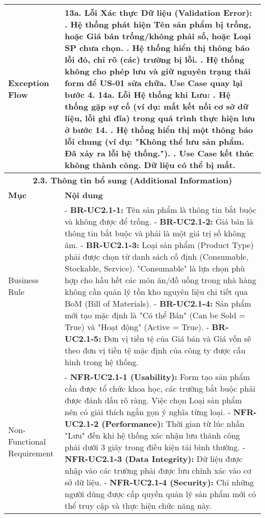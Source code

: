 \begin{longtable}{|m{4cm}|p{11cm}|}
\hline
Exception Flow & \textbf{13a. Lỗi Xác thực Dữ liệu (Validation Error):} \newline    1. Hệ thống phát hiện Tên sản phẩm bị trống, hoặc Giá bán trống/không phải số, hoặc Loại SP chưa chọn. \newline    2. Hệ thống hiển thị thông báo lỗi đỏ, chỉ rõ (các) trường bị lỗi. \newline    3. Hệ thống không cho phép lưu và giữ nguyên trạng thái form để US-01 sửa chữa. Use Case quay lại bước 4. \newline \textbf{14a. Lỗi Hệ thống khi Lưu:} \newline    1. Hệ thống gặp sự cố (ví dụ: mất kết nối cơ sở dữ liệu, lỗi ghi đĩa) trong quá trình thực hiện lưu ở bước 14. \newline    2. Hệ thống hiển thị một thông báo lỗi chung (ví dụ: "Không thể lưu sản phẩm. Đã xảy ra lỗi hệ thống."). \newline    3. Use Case kết thúc không thành công. Dữ liệu có thể bị mất. \\
\hline
\multicolumn{2}{|c|}{\textbf{2.3. Thông tin bổ sung (Additional Information)}} \\
\hline
\textbf{Mục} & \textbf{Nội dung} \\
\hline
Business Rule & - \textbf{BR-UC2.1-1:} Tên sản phẩm là thông tin bắt buộc và không được để trống. \newline - \textbf{BR-UC2.1-2:} Giá bán là thông tin bắt buộc và phải là một giá trị số không âm. \newline - \textbf{BR-UC2.1-3:} Loại sản phẩm (Product Type) phải được chọn từ danh sách cố định (Consumable, Stockable, Service). "Consumable" là lựa chọn phù hợp cho hầu hết các món ăn/đồ uống trong nhà hàng không cần quản lý tồn kho nguyên liệu chi tiết qua BoM (Bill of Materials). \newline - \textbf{BR-UC2.1-4:} Sản phẩm mới tạo mặc định là "Có thể Bán" (Can be Sold = True) và "Hoạt động" (Active = True). \newline - \textbf{BR-UC2.1-5:} Đơn vị tiền tệ của Giá bán và Giá vốn sẽ theo đơn vị tiền tệ mặc định của công ty được cấu hình trong hệ thống. \\
\hline
Non-Functional Requirement & - \textbf{NFR-UC2.1-1 (Usability):} Form tạo sản phẩm cần được tổ chức khoa học, các trường bắt buộc phải được đánh dấu rõ ràng. Việc chọn Loại sản phẩm nên có giải thích ngắn gọn ý nghĩa từng loại. \newline - \textbf{NFR-UC2.1-2 (Performance):} Thời gian từ lúc nhấn "Lưu" đến khi hệ thống xác nhận lưu thành công phải dưới 3 giây trong điều kiện tải bình thường. \newline - \textbf{NFR-UC2.1-3 (Data Integrity):} Dữ liệu được nhập vào các trường phải được lưu chính xác vào cơ sở dữ liệu. \newline - \textbf{NFR-UC2.1-4 (Security):} Chỉ những người dùng được cấp quyền quản lý sản phẩm mới có thể truy cập và thực hiện chức năng này. \\
\hline

\end{longtable}

